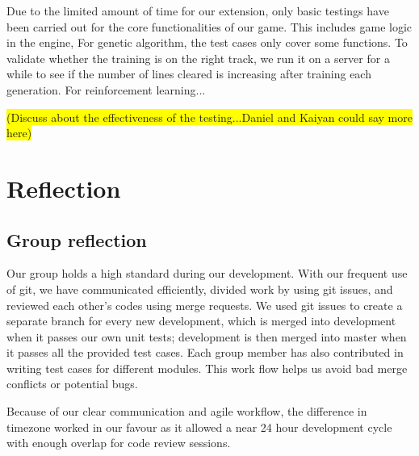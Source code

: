 \documentclass[11pt]{article}
\begin{document}
\begin{flushleft}
Due to the limited amount of time for our extension, only basic testings have been carried out for the core functionalities of our game. This includes game logic in the  engine, 
For genetic algorithm, the test cases only cover some functions. To validate whether the training is on the right track, we run it on a server for a while to see if the number of lines cleared is increasing after training each generation. For reinforcement learning...
\end{flushleft}

\begin{flushleft}
\colorbox{yellow}{(Discuss about the effectiveness of the testing...Daniel and Kaiyan could say more here)}
\end{flushleft}


\section{Reflection}


\subsection{Group reflection}
\begin{flushleft}
Our group holds a high standard during our development. With our frequent use of git, we have communicated efficiently, divided work by using git issues, and reviewed each other's codes using merge requests. We used git issues to create a separate branch for every new development, which is merged into development when it passes our own unit tests; development is then merged into master when it passes all the provided test cases. Each group member has also contributed in writing test cases for different modules. This work flow helps us avoid bad merge conflicts or potential bugs. 
\end{flushleft}

\begin{flushleft}
Because of our clear communication and agile workflow, the difference in timezone worked in our favour as it allowed a near 24 hour development cycle with enough overlap for code review sessions. 
\end{flushleft}
\end{document}
